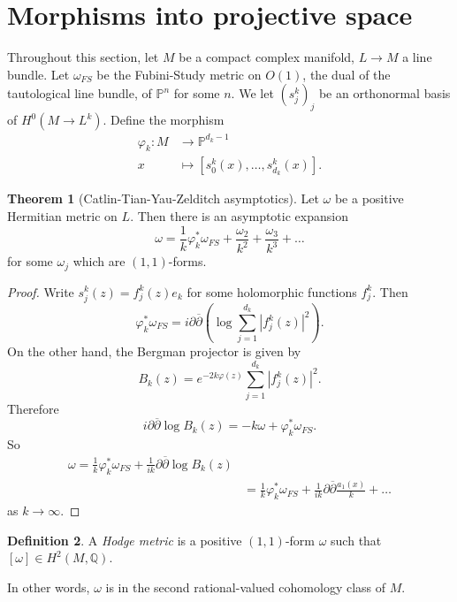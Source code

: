 \documentclass[12pt]{report}
\newcommand{\QQ}{\mathbb{Q}}
\newcommand{\PP}{\mathbb{P}}
\newcommand{\dbar}{\overline\partial}
\newcommand{\dfn}[1]{\emph{#1}\index{#1}}
\theoremstyle{definition}
\newtheorem{theorem}{Theorem}[chapter]
\newtheorem{definition}[theorem]{Definition}
\begin{document}
\section{Morphisms into projective space}
    Throughout this section, let $M$ be a compact complex manifold, $L \to M$ a line bundle. Let $\omega_{FS}$ be the Fubini-Study metric on $O(1)$, the dual of the tautological line bundle, of $\PP^n$ for some $n$. We let $(s_j^k)_j$ be an orthonormal basis of $H^0(M \to L^k)$. Define the morphism
\begin{align*}
    \varphi_k: M &\to \PP^{d_k - 1}\\
    x &\mapsto [s_0^k(x), \dots, s_{d_k}^k(x)].
\end{align*}

\begin{theorem}[Catlin-Tian-Yau-Zelditch asymptotics]
    Let $\omega$ be a positive Hermitian metric on $L$. Then there is an asymptotic expansion
    $$\omega = \frac{1}{k}\varphi^*_k\omega_{FS} + \frac{\omega_2}{k^2} + \frac{\omega_3}{k^3} + \dots$$
    for some $\omega_j$ which are $(1, 1)$-forms.
\end{theorem}
\begin{proof}
    Write $s_j^k(z) = f_j^k(z)e_k$ for some holomorphic functions $f_j^k$. Then
    $$\varphi_k^*\omega_{FS} = i\partial \dbar\left(\log \sum_{j=1}^{d_k} |f_j^k(z)|^2 \right).$$
    On the other hand, the Bergman projector is given by
    $$B_k(z) = e^{-2k\varphi(z)} \sum_{j=1}^{d_k} |f_j^k(z)|^2.$$
    Therefore
    $$i\partial\dbar \log B_k(z) = -k \omega + \varphi_k^* \omega_{FS}.$$
    So
    \begin{align*}
        \omega = \frac{1}{k} \varphi_k^*\omega_{FS} + \frac{1}{ik} \partial \dbar \log B_k(z)\\
            &= \frac{1}{k} \varphi_k^*\omega_{FS} + \frac{1}{ik} \partial \dbar \frac{a_1(x)}{k} + \dots
    \end{align*}
    as $k \to \infty$.
\end{proof}

\begin{definition}
    A \dfn{Hodge metric} is a positive $(1, 1)$-form $\omega$ such that $[\omega] \in H^2(M, \QQ)$.
\end{definition}
    In other words, $\omega$ is in the second rational-valued cohomology class of $M$.
\end{document}
